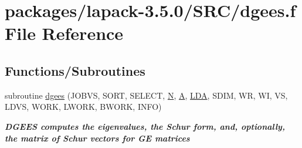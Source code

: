 \hypertarget{dgees_8f}{}\section{packages/lapack-\/3.5.0/\+S\+R\+C/dgees.f File Reference}
\label{dgees_8f}
\subsection*{Functions/\+Subroutines}
\begin{DoxyCompactItemize}
\item 
subroutine \hyperlink{group__doubleGEeigen_ga2233e8611b7b529422497036b284b438}{dgees} (J\+O\+B\+V\+S, S\+O\+R\+T, S\+E\+L\+E\+C\+T, \hyperlink{polmisc_8c_a0240ac851181b84ac374872dc5434ee4}{N}, \hyperlink{classA}{A}, \hyperlink{example__user_8c_ae946da542ce0db94dced19b2ecefd1aa}{L\+D\+A}, S\+D\+I\+M, W\+R, W\+I, V\+S, L\+D\+V\+S, W\+O\+R\+K, L\+W\+O\+R\+K, B\+W\+O\+R\+K, I\+N\+F\+O)
\begin{DoxyCompactList}\small\item\em {\bfseries  D\+G\+E\+E\+S computes the eigenvalues, the Schur form, and, optionally, the matrix of Schur vectors for G\+E matrices} \end{DoxyCompactList}\end{DoxyCompactItemize}
